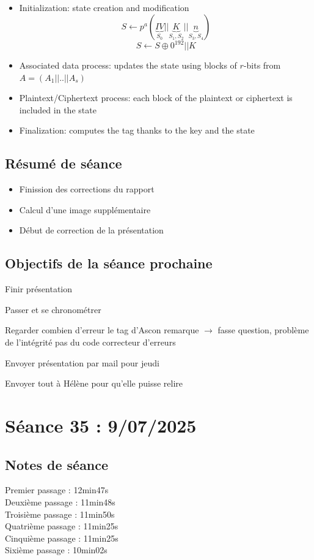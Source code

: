 \documentclass[12pt]{article}
\newcommand{\cmark}{\ding{51}}%
\newcommand{\done}{\rlap{$\square$}{\raisebox{2pt}{\large\hspace{1pt}\cmark}}%
	\hspace{-2.5pt}}
\begin{document}
	\begin{itemize}
		\item Initialization: state creation and modification
		$$S \leftarrow p^{a}( \underbrace{IV}_{S_0}||\underbrace{K}_{S_1,S_2}||\underbrace{n}_{S_3,S_4})$$
		$$S \leftarrow S \oplus 0^{192} || K$$
		\item Associated data process: updates the state using blocks of $r$-bits from $A=(A_1||..||A_s)$
		\item Plaintext/Ciphertext process: each block of the plaintext or ciphertext is included in the state
		\item Finalization: computes the tag thanks to the key and the state
	\end{itemize}	
	
	\subsection{Résumé de séance}
	\begin{itemize}
		\item Finission des corrections du rapport
		\item Calcul d'une image supplémentaire
		\item Début de correction de la présentation
	\end{itemize}
	
	\subsection{Objectifs de la séance prochaine}
	\begin{todolist}
		\item[\done] Finir présentation
		\item[\done] Passer et se chronométrer
		\item[\done] Regarder combien d'erreur le tag d'Ascon remarque $\rightarrow$ fasse question, problème de l'intégrité pas du code correcteur d'erreurs
		\item[\done] Envoyer présentation par mail pour jeudi
		\item[\done] Envoyer tout à Hélène pour qu'elle puisse relire
	\end{todolist}
	
	
	\section{Séance 35 : 9/07/2025}
	\subsection{Notes de séance}
	Premier passage : 12min47s\\
	Deuxième passage : 11min48s\\
	Troisième passage : 11min50s\\
	Quatrième passage : 11min25s\\
	Cinquième passage : 11min25s\\
	Sixième passage : 10min02s\\
	
\end{document}
